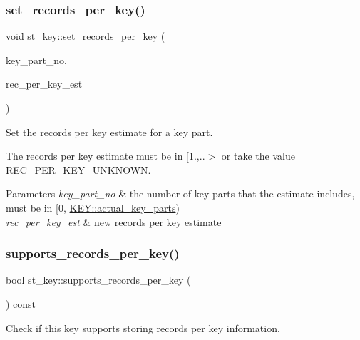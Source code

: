 \subsubsection{\texorpdfstring{set\+\_\+records\+\_\+per\+\_\+key()}{set\_records\_per\_key()}}
{\footnotesize\ttfamily void st\+\_\+key\+::set\+\_\+records\+\_\+per\+\_\+key (\begin{DoxyParamCaption}\item[{uint}]{key\+\_\+part\+\_\+no,  }\item[{rec\+\_\+per\+\_\+key\+\_\+t}]{rec\+\_\+per\+\_\+key\+\_\+est }\end{DoxyParamCaption})\hspace{0.3cm}{\ttfamily [inline]}}

Set the records per key estimate for a key part.

The records per key estimate must be in \mbox{[}1.,..$>$ or take the value R\+E\+C\+\_\+\+P\+E\+R\+\_\+\+K\+E\+Y\+\_\+\+U\+N\+K\+N\+O\+WN.


\begin{DoxyParams}{Parameters}
{\em key\+\_\+part\+\_\+no} & the number of key parts that the estimate includes, must be in \mbox{[}0, \mbox{\hyperlink{structst__key_ae6e21b5421c8c6f5a53fc5ec3dbeea80}{K\+E\+Y\+::actual\+\_\+key\+\_\+parts}}) \\
\hline
{\em rec\+\_\+per\+\_\+key\+\_\+est} & new records per key estimate \\
\hline
\end{DoxyParams}
\mbox{\label{structst__key_a8fb59a5bb0f270960ef6ffac8190869e}} 
\subsubsection{\texorpdfstring{supports\+\_\+records\+\_\+per\+\_\+key()}{supports\_records\_per\_key()}}
{\footnotesize\ttfamily bool st\+\_\+key\+::supports\+\_\+records\+\_\+per\+\_\+key (\begin{DoxyParamCaption}{ }\end{DoxyParamCaption}) const\hspace{0.3cm}{\ttfamily [inline]}}

Check if this key supports storing records per key information.

